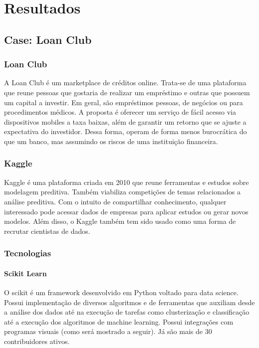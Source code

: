 \part{Resultados}

\chapter{Case: Loan Club}

\section{Loan Club}

A Loan Club é um marketplace de créditos online. Trata-se de uma plataforma que reune pessoas que gostaria de realizar um empréstimo e outras que possuem um capital a investir. Em geral, são empréstimos pessoas, de negócios ou para procedimentos médicos. A proposta é oferecer um serviço de fácil acesso via dispositivos mobiles a taxa baixas, além de garantir um retorno que se ajuste a expectativa do investidor. Dessa forma, operam de forma menos burocrática do que um banco, mas assumindo os riscos de uma instituição financeira.

\section{Kaggle}

Kaggle é uma plataforma criada em 2010 que reune ferramentas e estudos sobre modelagem preditiva. Também viabiliza competições de temas relacionados a análise preditiva. Com o intuito de compartilhar conhecimento, qualquer interessado pode acessar dados de empresas para aplicar estudos ou gerar novos modelos. Além disso, o Kaggle também tem sido usado como uma forma de recrutar cientistas de dados. 

\section{Tecnologias}

\subsection{Scikit Learn}

O scikit é um framework desenvolvido em Python voltado para data science. Possui implementação de diversos algoritmos e de ferramentas que auxiliam desde a análise dos dados até na execução de tarefas como clusterização e classificação até a execução dos algoritmos de machine learning. Possui integrações com programas visuais (como será mostrado a seguir). Já são mais de 30 contribuidores ativos.


